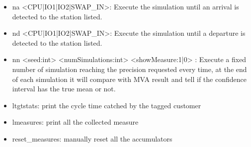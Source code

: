 \documentclass[12pt,a4paper]{article}
\begin{document}
\begin{itemize}
        \item na <CPU|IO1|IO2|SWAP\_IN>: Execute the simulation until an arrival is detected to the station listed.
        \item nd <CPU|IO1|IO2|SWAP\_IN>: Execute the simulation until a departure is detected to the station listed.
        \item nn <seed:int> <numSimulations:int> <showMeasure:1|0> : Execute a fixed number of simulation reaching the precision requested every time, at the end of each simulation it will compare with MVA result and tell if the confidence interval has the true mean or not.
        \item ltgtstats: print the cycle time catched by the tagged customer
        \item lmeasures: print all the collected measure
        \item reset\_measures: manually reset all the accumulators
        
    \end{itemize}
    
\end{document}

